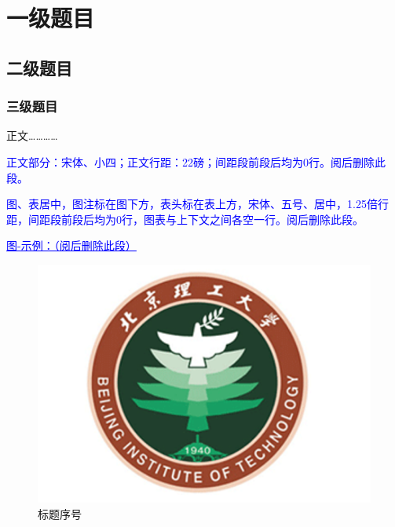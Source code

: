 %
%
%
%
%
%

\chapter{一级题目}

\section{二级题目}

\subsection{三级题目}

正文……\cite{yuFeiJiZongTiDuoXueKeSheJiYouHuaDeXianZhuangYuFaZhanFangXiang2008}……\cite{Hajela2012Application}

\textcolor{blue}{正文部分：宋体、小四；正文行距：22磅；间距段前段后均为0行。阅后删除此段。}

\textcolor{blue}{图、表居中，图注标在图下方，表头标在表上方，宋体、五号、居中，1.25倍行距，间距段前段后均为0行，图表与上下文之间各空一行。阅后删除此段。}

\textcolor{blue}{\underline{\underline{图-示例：（阅后删除此段）}}}

\setlength{\intextsep}{1\baselineskip plus 0.2\baselineskip minus 0.2\baselineskip}

\begin{figure}[htbp]
  \centering
  \includegraphics[]{images/bit_logo.png}
  \caption{标题序号}\label{标题序号} %
\end{figure}

